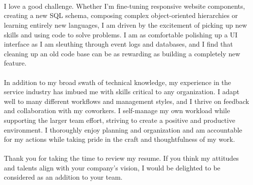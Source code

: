 \newpage
{}\\\\
\noindent\makebox[\linewidth]{\rule{\textwidth}{0.4pt}}\\

I love a good challenge. Whether I'm fine-tuning responsive website components, creating a new SQL schema, composing complex object-oriented hierarchies or learning entirely new languages, I am driven by the excitement of picking up new skills and using code to solve problems.  I am as comfortable polishing up a UI interface as I am sleuthing through event logs and databases, and I find that cleaning up an old code base can be as rewarding as building a completely new feature. \\\\

In addition to my broad swath of technical knowledge, my experience in the service industry has imbued me with skills critical to any organization. I adapt well to many different workflows and management styles, and I thrive on feedback and collaboration with my coworkers. I self-manage my own workload while supporting the larger team effort, striving to create a positive and productive environment. I thoroughly enjoy planning and organization and am accountable for my actions while taking pride in the craft and thoughtfulness of my work.\\\\


Thank you for taking the time to review my resume. If you think my attitudes and talents align with your company's vision, I would be delighted to be considered as an addition to your team. \\\\\\



